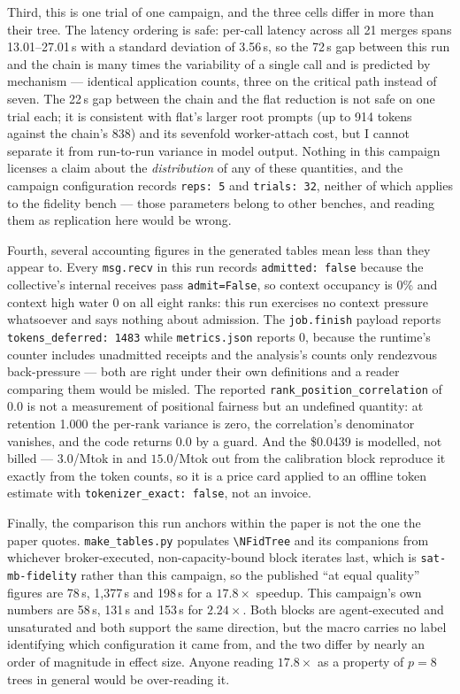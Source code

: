 \documentclass[11pt]{article}
\begin{document}
Third, this is one trial of one campaign, and the three cells differ in more than their
tree. The latency ordering is safe: per-call latency across all 21 merges spans
13.01--27.01\,s with a standard deviation of 3.56\,s, so the 72\,s gap between this run
and the chain is many times the variability of a single call and is predicted by
mechanism --- identical application counts, three on the critical path instead of seven.
The 22\,s gap between the chain and the flat reduction is not safe on one trial each; it
is consistent with flat's larger root prompts (up to 914 tokens against the chain's 838)
and its sevenfold worker-attach cost, but I cannot separate it from run-to-run variance
in model output. Nothing in this campaign licenses a claim about the \emph{distribution}
of any of these quantities, and the campaign configuration records
\texttt{reps: 5} and \texttt{trials: 32}, neither of which applies to the fidelity bench
--- those parameters belong to other benches, and reading them as replication here would
be wrong.

Fourth, several accounting figures in the generated tables mean less than they appear
to. Every \texttt{msg.recv} in this run records \texttt{admitted: false} because the
collective's internal receives pass \texttt{admit=False}, so context occupancy is 0\%
and context high water 0 on all eight ranks: this run exercises no context pressure
whatsoever and says nothing about admission. The \texttt{job.finish} payload reports
\texttt{tokens\_deferred: 1483} while \texttt{metrics.json} reports 0, because the
runtime's counter includes unadmitted receipts and the analysis's counts only rendezvous
back-pressure --- both are right under their own definitions and a reader comparing them
would be misled. The reported \texttt{rank\_position\_correlation} of 0.0 is not a
measurement of positional fairness but an undefined quantity: at retention 1.000 the
per-rank variance is zero, the correlation's denominator vanishes, and the code returns
0.0 by a guard. And the \$0.0439 is modelled, not billed --- $3.0$/Mtok in and
$15.0$/Mtok out from the calibration block reproduce it exactly from the token counts,
so it is a price card applied to an offline token estimate with
\texttt{tokenizer\_exact: false}, not an invoice.

Finally, the comparison this run anchors within the paper is not the one the paper
quotes. \texttt{make\_tables.py} populates \texttt{\textbackslash NFidTree} and its
companions from whichever broker-executed, non-capacity-bound block iterates last, which
is \texttt{sat-mb-fidelity} rather than this campaign, so the published ``at equal
quality'' figures are 78\,s, 1{,}377\,s and 198\,s for a $17.8\times$ speedup. This
campaign's own numbers are 58\,s, 131\,s and 153\,s for $2.24\times$. Both blocks are
agent-executed and unsaturated and both support the same direction, but the macro
carries no label identifying which configuration it came from, and the two differ by
nearly an order of magnitude in effect size. Anyone reading $17.8\times$ as a property
of $p = 8$ trees in general would be over-reading it.
\end{document}
